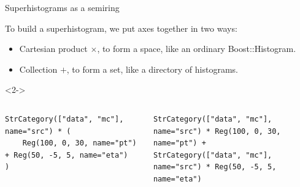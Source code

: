 \documentclass[aspectratio=169]{beamer}
\begin{document}
\begin{frame}[fragile]{Superhistograms as a semiring}
\large
\vspace{0.5 cm}

To build a superhistogram, we put axes together in two ways:

\vspace{0.25 cm}
\begin{itemize}
\item Cartesian product $\times$, to form a space, like an ordinary Boost::Histogram.
\item Collection $+$, to form a set, like a directory of histograms.
\end{itemize}

\vspace{0.5 cm}
\begin{uncoverenv}<2->
\begin{columns}

\small
\begin{verbatim}
StrCategory(["data", "mc"], name="src") * (
    Reg(100, 0, 30, name="pt") + Reg(50, -5, 5, name="eta")
)
\end{verbatim}

\vspace{-0.3 cm}

\vspace{0.1 cm}
\begin{verbatim}
StrCategory(["data", "mc"], name="src") * Reg(100, 0, 30, name="pt") +
StrCategory(["data", "mc"], name="src") * Reg(50, -5, 5, name="eta")
\end{verbatim}

\vspace{0.1 cm}
\end{columns}
\end{uncoverenv}
\end{frame}
\end{document}
